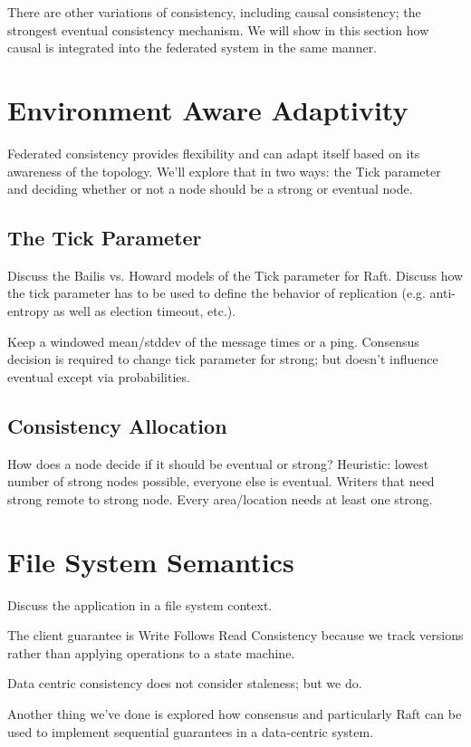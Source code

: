 \documentclass[letterpaper,twocolumn,10pt]{article}
\begin{document}
There are other variations of consistency, including causal consistency; the strongest eventual consistency mechanism. We will show in this section how causal is integrated into the federated system in the same manner.

\section{Environment Aware Adaptivity}

Federated consistency provides flexibility and can adapt itself based on its awareness of the topology. We'll explore that in two ways: the Tick parameter and deciding whether or not a node should be a strong or eventual node.

\subsection{The Tick Parameter}

Discuss the Bailis vs. Howard models of the Tick parameter for Raft. Discuss how the tick parameter has to be used to define the behavior of replication (e.g. anti-entropy as well as election timeout, etc.).

Keep a windowed mean/stddev of the message times or a ping. Consensus decision is required to change tick parameter for strong; but doesn't influence eventual except via probabilities.

\subsection{Consistency Allocation}

How does a node decide if it should be eventual or strong? Heuristic: lowest number of strong nodes possible, everyone else is eventual. Writers that need strong remote to strong node. Every area/location needs at least one strong.

\section{File System Semantics}

Discuss the application in a file system context.

The client guarantee is Write Follows Read Consistency because we track versions rather than applying operations to a state machine.

Data centric consistency does not consider staleness; but we do.

Another thing we've done is explored how consensus and particularly Raft can be used to implement sequential guarantees in a data-centric system.
\end{document}
